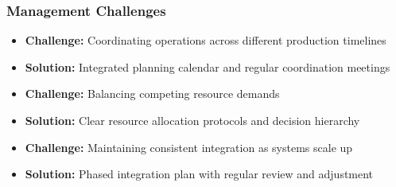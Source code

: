 \subsubsection{Management Challenges}
\begin{itemize}
    \item \textbf{Challenge:} Coordinating operations across different production timelines
    \item \textbf{Solution:} Integrated planning calendar and regular coordination meetings
    
    \item \textbf{Challenge:} Balancing competing resource demands
    \item \textbf{Solution:} Clear resource allocation protocols and decision hierarchy
    
    \item \textbf{Challenge:} Maintaining consistent integration as systems scale up
    \item \textbf{Solution:} Phased integration plan with regular review and adjustment
\end{itemize}
